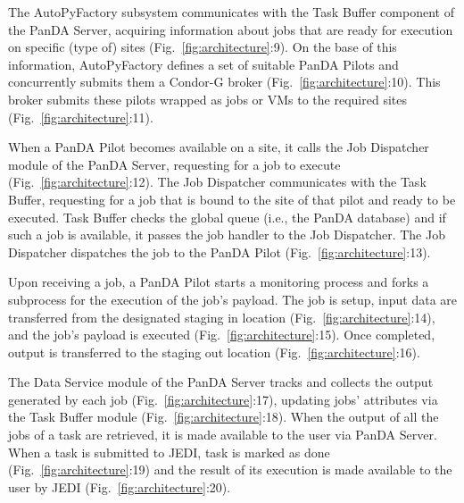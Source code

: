 The AutoPyFactory subsystem communicates with the Task Buffer component of the
PanDA Server, acquiring information about jobs that are ready for execution on
specific (type of) sites (Fig.~\ref{fig:architecture}:9). On the base of this
information, AutoPyFactory defines a set of suitable PanDA Pilots and
concurrently submits them a Condor-G broker (Fig.~\ref{fig:architecture}:10).
This broker submits these pilots wrapped as jobs or VMs to the required sites
(Fig.~\ref{fig:architecture}:11).


When a PanDA Pilot becomes available on a site, it
calls the Job Dispatcher module of the PanDA Server, requesting for a job to
execute (Fig.~\ref{fig:architecture}:12). The Job Dispatcher communicates with
the Task Buffer, requesting for a job that is bound to the site of that pilot
and ready to be executed. Task Buffer checks the global queue (i.e., the PanDA
database) and if such a job is available, it passes the job handler to the Job
Dispatcher. The Job Dispatcher dispatches the job to the PanDA Pilot
(Fig.~\ref{fig:architecture}:13).


Upon receiving a job, a PanDA Pilot starts a monitoring process and forks a
subprocess for the execution of the job's payload. The job is setup, input data
are transferred from the designated staging in location
(Fig.~\ref{fig:architecture}:14), and the job's payload is executed
(Fig.~\ref{fig:architecture}:15). Once completed, output is transferred to the
staging out location (Fig.~\ref{fig:architecture}:16).


The Data Service module of the PanDA Server tracks and collects the output
generated by each job (Fig.~\ref{fig:architecture}:17), updating jobs'
attributes via the Task Buffer module (Fig.~\ref{fig:architecture}:18). When the
output of all the jobs of a task are retrieved, it is made available to the user
via PanDA Server. When a task is submitted to JEDI, task is marked as done
(Fig.~\ref{fig:architecture}:19) and the result of its execution is made
available to the user by JEDI (Fig.~\ref{fig:architecture}:20).

